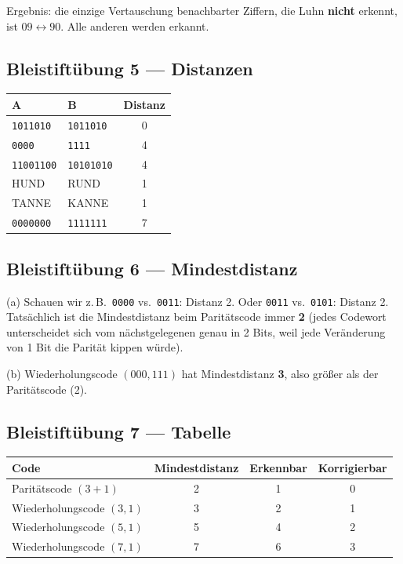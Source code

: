 
Ergebnis: die einzige Vertauschung benachbarter Ziffern, die Luhn
\textbf{nicht} erkennt, ist $09 \leftrightarrow 90$. Alle anderen
werden erkannt.

\subsection*{Bleistiftübung 5 — Distanzen}

\begin{center}
\begin{tabular}{llc}
  \toprule
  A & B & Distanz \\
  \midrule
  \texttt{1011010}  & \texttt{1011010}  & 0 \\
  \texttt{0000}     & \texttt{1111}     & 4 \\
  \texttt{11001100} & \texttt{10101010} & 4 \\
  HUND              & RUND              & 1 \\
  TANNE             & KANNE             & 1 \\
  \texttt{0000000}  & \texttt{1111111}  & 7 \\
  \bottomrule
\end{tabular}
\end{center}

\subsection*{Bleistiftübung 6 — Mindestdistanz}

(a) Schauen wir z.\,B.\ \texttt{0000} vs.\ \texttt{0011}: Distanz 2.
Oder \texttt{0011} vs.\ \texttt{0101}: Distanz 2. Tatsächlich ist die
Mindestdistanz beim Paritätscode immer \textbf{2} (jedes Codewort
unterscheidet sich vom nächstgelegenen genau in 2 Bits, weil jede
Veränderung von 1 Bit die Parität kippen würde).

(b) Wiederholungscode $(000, 111)$ hat Mindestdistanz \textbf{3}, also
größer als der Paritätscode (2).

\subsection*{Bleistiftübung 7 — Tabelle}

\begin{center}
\begin{tabular}{lccc}
  \toprule
  Code & Mindestdistanz & Erkennbar & Korrigierbar \\
  \midrule
  Paritätscode $(3+1)$        & 2 & 1 & 0 \\
  Wiederholungscode $(3,1)$   & 3 & 2 & 1 \\
  Wiederholungscode $(5,1)$   & 5 & 4 & 2 \\
  Wiederholungscode $(7,1)$   & 7 & 6 & 3 \\
  \bottomrule
\end{tabular}
\end{center}

